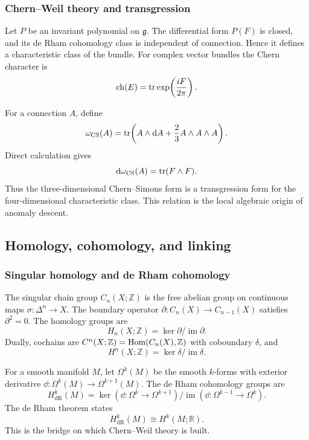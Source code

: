 \subsubsection{Chern--Weil theory and transgression}

Let $P$ be an invariant polynomial on $\mathfrak g$. The differential form $P(F)$ is closed, and its de Rham cohomology class is independent of connection. Hence it defines a characteristic class of the bundle. For complex vector bundles the Chern character is
\begin{equation}
  \operatorname{ch}(E)=\operatorname{tr}\exp\!\left(\frac{iF}{2\pi}\right).
\end{equation}

For a connection $A$, define
\begin{equation}
  \omega_{\operatorname{CS}}(A)=\operatorname{tr}\!\left(A\wedge \mathrm{d} A + \frac{2}{3}A\wedge A\wedge A\right).
\end{equation}
Direct calculation gives
\begin{equation}
  \mathrm{d}\omega_{\operatorname{CS}}(A)=\operatorname{tr}(F\wedge F).
\end{equation}
Thus the three-dimensional Chern--Simons form is a transgression form for the four-dimensional characteristic class. This relation is the local algebraic origin of anomaly descent.

\subsection{Homology, cohomology, and linking}

\subsubsection{Singular homology and de Rham cohomology}

The singular chain group $C_n(X;\mathbb{Z})$ is the free abelian group on continuous maps $\sigma : \Delta^n \to X$. The boundary operator $\partial : C_n(X) \to C_{n-1}(X)$ satisfies $\partial^2=0$. The homology groups are
\begin{equation}
  H_n(X;\mathbb{Z}) = \ker \partial / \operatorname{im} \partial.
\end{equation}
Dually, cochains are $C^n(X;\mathbb{Z}) = \operatorname{Hom}(C_n(X),\mathbb{Z})$ with coboundary $\delta$, and
\begin{equation}
  H^n(X;\mathbb{Z}) = \ker \delta / \operatorname{im} \delta.
\end{equation}

For a smooth manifold $M$, let $\Omega^k(M)$ be the smooth $k$-forms with exterior derivative $\dd : \Omega^k(M) \to \Omega^{k+1}(M)$. The de Rham cohomology groups are
\begin{equation}
  H^k_{\mathrm{dR}}(M) = \ker(\dd : \Omega^k \to \Omega^{k+1}) / \operatorname{im}(\dd : \Omega^{k-1} \to \Omega^k).
\end{equation}
The de Rham theorem states
\begin{equation}
  H^k_{\mathrm{dR}}(M) \cong H^k(M;\mathbb{R}).
\end{equation}
This is the bridge on which Chern--Weil theory is built.

